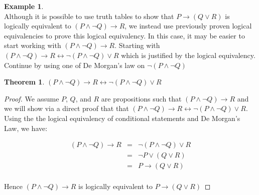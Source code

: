 \documentclass{book}
\newtheorem{theorem}{Theorem}[section]
\theoremstyle{definition}
\newtheorem{example}{Example}[definition]
\theoremstyle{remark}
\begin{document}
\begin{example}
\cite[Chap.2, P.C.2.7, Q.1]{ted} \\

Although it is possible to use truth tables to show that $P \to (Q \vee R)$ is logically equivalent to $(P \wedge \neg Q) \to R$, we instead use previously proven logical equivalencies to prove this logical equivalency. In this case, it may be easier to start working with $(P \wedge \neg Q) \to R$. Starting with $(P \wedge \neg Q) \to R \leftrightarrow \neg (P \wedge \neg Q) \vee R$ which is justified by the logical equivalency. Continue by using one of De Morgan's law on $\neg (P \wedge \neg Q)$ \\ 


\begin{tcolorbox}
    \begin{theorem}
        $(P \wedge \neg Q) \to R \leftrightarrow \neg (P \wedge \neg Q) \vee R$
    \end{theorem}
\end{tcolorbox}

\begin{proof}
    We assume $P$, $Q$, and $R$ are propositions such that $(P \wedge \neg Q) \to R$ and we will show via a direct proof that that $(P \wedge \neg Q) \to R \leftrightarrow \neg (P \wedge \neg Q) \vee R$. Using the the logical equivalency of conditional statements and De Morgan's Law, we have: 
    
    \begin{eqnarray}
        (P \wedge \neg Q) \to R & = & \neg (P \wedge \neg Q) \vee R \nonumber \\
        & = & \neg P \vee (Q \vee R) \nonumber \\
        & = & P \to (Q \vee R) \nonumber \\
    \end{eqnarray}
    
    Hence $(P \wedge \neg Q) \to R$ is logically equivalent to $P \to (Q \vee R)$
\end{proof}
\end{example}
\end{document}
